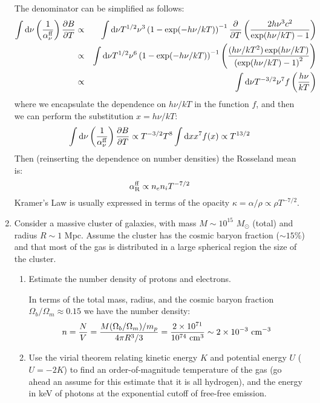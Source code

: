 \documentclass[11pt, preprint]{article}
\begin{document}
\begin{enumerate}
\begin{answer}
    The denominator can be simplified as follows:
    \begin{eqnarray}
      \int {\rm d}\nu \left(\frac{1}{\alpha_\nu^{\rm ff}}\right)
      \frac{\partial B}{\partial T}
      &\propto&
      \int {\rm d}\nu T^{1/2} \nu^3 \left(1-
      \exp(-h\nu/kT)\right)^{-1}
      \frac{\partial}{\partial T}\left(\frac{2 h \nu^3
        c^2}{\exp(h\nu/kT) -1}\right) \cr 
     &\propto&
     \int {\rm d}\nu T^{1/2} \nu^6 \left(1- \exp(-h\nu/kT)\right)^{-1}
     \left(\frac{(h\nu/kT^2) \exp(h\nu/kT)
     }{\left(\exp(h\nu/kT) -1\right)^2}\right) \cr 
     &\propto&
     \int {\rm d}\nu T^{-3/2} \nu^7 f\left(\frac{h\nu}{kT}\right)
    \end{eqnarray}
    where we encapsulate the dependence on $h\nu/kT$ in the function
    $f$, and then we can perform the substitution $x = h\nu/kT$:
    \begin{equation}
      \int {\rm d}\nu \left(\frac{1}{\alpha_\nu^{\rm ff}}\right)
      \frac{\partial B}{\partial T} \propto T^{-3/2} T^{8} \int {\rm
        d}x x^7 f(x) \propto T^{13/2}
    \end{equation}
    Then (reinserting the dependence on number densities) the
    Rosseland mean is:
    \begin{equation}
      \alpha_{\rm R}^{\rm ff} \propto n_e n_i T^{-7/2}
    \end{equation}
    Kramer's Law is usually expressed in terms of the opacity $\kappa
    = \alpha/\rho \propto \rho T^{-7/2}$.
  \end{answer}

\item Consider a massive cluster of galaxies, with mass $M\sim
  10^{15}$ $M_\odot$ (total) and radius $R\sim 1$ Mpc. Assume
  the cluster has the cosmic baryon fraction ($\sim 15\%$) and that
  most of the gas is distributed in a large spherical region the size
  of the cluster.
\begin{enumerate}
  \item Estimate the number density of protons and electrons. 

    \begin{answer}
      In terms of the total mass, radius, and the cosmic baryon
      fraction $\Omega_b/\Omega_m \approx 0.15$ we have the number
      density:
      \begin{equation}
        n = \frac{N}{V} = \frac{M (\Omega_b/\Omega_m) / m_p}{4\pi
          R^3/3} = \frac{2\times 10^{71}}{10^{74} {\rm ~cm}^3} \sim
        2\times 10^{-3} {\rm ~cm}^{-3}
      \end{equation}
    \end{answer}
  \item Use the virial theorem relating kinetic energy $K$ and
    potential energy $U$ ($U = -2K$) to find an order-of-magnitude
    temperature of the gas (go ahead an assume for this estimate that
    it is all hydrogen), and the energy in keV of photons at the
    exponential cutoff of free-free emission.


\end{enumerate}
\end{enumerate}
\end{document}

